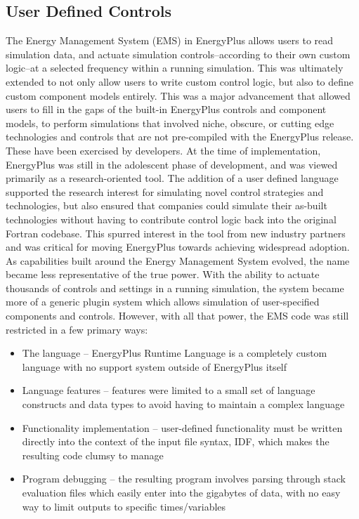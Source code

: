 \documentclass[5p]{elsarticle}
\begin{document}
  \subsection{User Defined Controls}
The Energy Management System (EMS) in EnergyPlus allows users to read simulation data, and actuate simulation controls--according to their own custom logic--at a selected frequency within a running simulation.  This was ultimately extended to not only allow users to write custom control logic, but also to define custom component models entirely.  This was a major advancement that allowed users to fill in the gaps of the built-in EnergyPlus controls and component models, to perform simulations that involved niche, obscure, or cutting edge technologies and controls that are not pre-compiled with the EnergyPlus release.  These have been exercised by developers. \cite{Dutton2012, Jones2013, Sardoueinasab2019, Sardoueinasab2020} At the time of implementation, EnergyPlus was still in the adolescent phase of development, and was viewed primarily as a research-oriented tool.  The addition of a user defined language supported the research interest for simulating novel control strategies and technologies, but also ensured that companies could simulate their as-built technologies without having to contribute control logic back into the original Fortran codebase.  This spurred interest in the tool from new industry partners and was critical for moving EnergyPlus towards achieving widespread adoption.  As capabilities built around the Energy Management System evolved, the name became less representative of the true power.  With the ability to actuate thousands of controls and settings in a running simulation, the system became more of a generic plugin system which allows simulation of user-specified components and controls.  However, with all that power, the EMS code was still restricted in a few primary ways:
\begin{itemize}
  \item The language -- EnergyPlus Runtime Language is a completely custom language with no support system outside of EnergyPlus itself
  \item Language features -- features were limited to a small set of language constructs and data types to avoid having to maintain a complex language
  \item Functionality implementation -- user-defined functionality must be written directly into the context of the input file syntax, IDF, which makes the resulting code clumsy to manage
  \item Program debugging -- the resulting program involves parsing through stack evaluation files which easily enter into the gigabytes of data, with no easy way to limit outputs to specific times/variables
\end{itemize}
\end{document}

